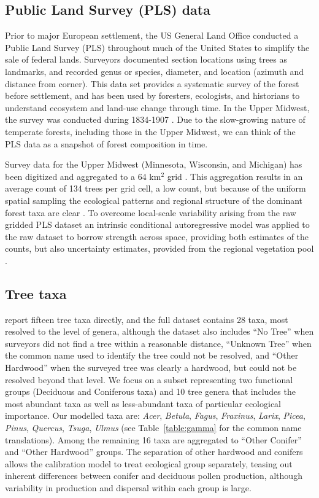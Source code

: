 \documentclass[12pt]{article}
\begin{document}
\subsection{Public Land Survey (PLS) data}
Prior to major European settlement, the US General Land Office
conducted a Public Land Survey (PLS) throughout much of the United
States to simplify the sale of federal lands. Surveyors documented
section locations using trees as landmarks, and recorded genus or
species, diameter, and location (azimuth and distance from
corner). This data set provides a systematic survey of the forest
before settlement, and has been used by foresters, ecologists, and
historians to understand ecosystem and land-use change through
time. In the Upper Midwest, the survey was conducted during 1834-1907
\citep{stewart1935public}. Due to the slow-growing nature of temperate
forests, including those in the Upper Midwest, we can think of the PLS
data as a snapshot of forest composition in time.

Survey data for the Upper Midwest (Minnesota, Wisconsin, and Michigan)
has been digitized and aggregated to a 64 km$^2$ grid
\citep{goring2015b}. This aggregation results in an average count of
134 trees per grid cell, a low count, but because of the uniform
spatial sampling the ecological patterns and regional structure of the
dominant forest taxa are clear \citep{goring2015b}. To overcome
local-scale variability arising from the raw gridded PLS dataset an
intrinsic conditional autoregressive model was applied to the raw
dataset to borrow strength across space, providing both estimates of
the counts, but also uncertainty estimates, provided from the regional
vegetation pool \citep{paciorek2015}.

\subsection{Tree taxa}

\citet{goring2015b} report fifteen tree taxa directly, and the full
dataset contains 28 taxa, most resolved to the level of genera,
although the dataset also includes ``No Tree'' when surveyors did not
find a tree within a reasonable distance, ``Unknown Tree'' when the
common name used to identify the tree could not be resolved, and
``Other Hardwood'' when the surveyed tree was clearly a hardwood, but
could not be resolved beyond that level. We focus on a subset
representing two functional groups (Deciduous and Coniferous taxa) and
10 tree genera that includes the most abundant taxa as well as
less-abundant taxa of particular ecological importance. Our modelled
taxa are: \textit{Acer}, \textit{Betula}, \textit{Fagus},
\textit{Fraxinus}, \textit{Larix}, \textit{Picea}, \textit{Pinus},
\textit{Quercus}, \textit{Tsuga}, \textit{Ulmus} (see
Table~\ref{table:gamma} for the common name translations). Among the
remaining 16 taxa are aggregated to ``Other Conifer'' and ``Other
Hardwood'' groups. The separation of other hardwood and conifers
allows the calibration model to treat ecological group separately,
teasing out inherent differences between conifer and deciduous pollen
production, although variability in production and dispersal within
each group is large.
\end{document}
